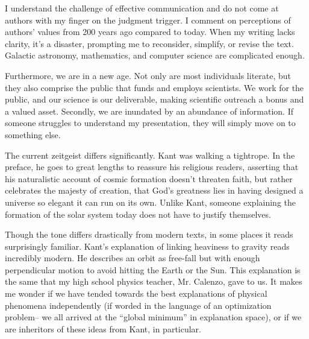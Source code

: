 I understand the challenge of effective communication and do not come at authors with my finger on the judgment trigger. I comment on perceptions of authors' values from 200 years ago compared to today. When my writing lacks clarity, it's a disaster, prompting me to reconsider, simplify, or revise the text. Galactic astronomy, mathematics, and computer science are complicated enough.

Furthermore, we are in a new age. Not only are most individuals literate, but they also comprise the public that funds and employs scientists. We work for the public, and our science is our deliverable, making scientific outreach a bonus and a valued asset. Secondly, we are inundated by an abundance of information. If someone struggles to understand my presentation, they will simply move on to something else.

The current zeitgeist differs significantly. Kant was walking a tightrope. In the preface, he goes to great lengths to reassure his religious readers, asserting that his naturalistic account of cosmic formation doesn't threaten faith, but rather celebrates the majesty of creation, that God's greatness lies in having designed a universe so elegant it can run on its own. Unlike Kant, someone explaining the formation of the solar system today does not have to justify themselves. 

Though the tone differs drastically from modern texts, in some places it reads surprisingly familiar. Kant's explanation of linking heaviness to gravity reads incredibly modern. He describes an orbit as free-fall but with enough perpendicular motion to avoid hitting the Earth or the Sun. This explanation is the same that my high school physics teacher, Mr. Calenzo, gave to us. It makes me wonder if we have tended towards the best explanations of physical phenomena independently (if worded in the language of an optimization problem– we all arrived at the “global minimum” in explanation space), or if we are inheritors of these ideas from Kant, in particular. 

